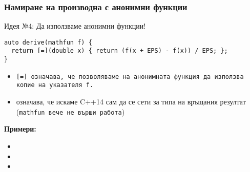 \documentclass{beamer}
\begin{document}
\begin{frame}[fragile]
  \frametitle{Намиране на производна с анонимни функции}
  \alert{Идея №4:} Да използваме анонимни функции!
  \pause
\begin{lstlisting}
auto derive(mathfun f) {
  return [=](double x) { return (f(x + EPS) - f(x)) / EPS; };
}
\end{lstlisting}
  \pause
  \begin{itemize}[<+->]
  \item \tt{[=]} означава, че позволяваме на анонимната функция да използва копие на указателя \tt{f}.
  \item{} означава, че искаме C++14 сам да се сети за типа на връщания резултат (\alert{\tt{mathfun} вече не върши работа})\\
  \end{itemize}
  \onslide<+->
  \textbf{Примери:}
  \begin{itemize}[<+->]
  \item {}
  \item {}
  \item {}
  \end{itemize}
\end{frame}
\end{document}
